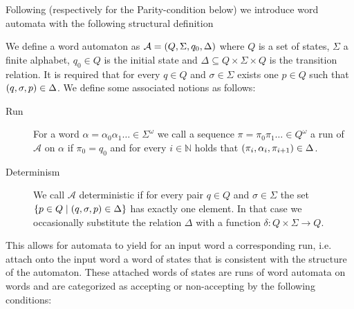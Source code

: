 \label{sec:wordautomata}
Following \cite{LangAutoLog} (respectively \cite[Chapter 1]{AutoLogInfGames}
for the Parity-condition below) we introduce word automata with the following
structural definition
\begin{definition}
  We define a word automaton as
  $\mathcal{A} = \left(Q, \Sigma, q_{0}, \Delta\right)$ where
  $Q$ is a set of states, $\Sigma$ a finite alphabet, $q_{0}\in Q$ is the
  initial state and $\Delta\subseteq Q\times\Sigma\times Q$ is the transition
  relation. It is required that for every $q\in Q$ and $\sigma\in\Sigma$ exists
  one $p\in Q$ such that $\left(q,\sigma, p\right)\in\Delta$. We define some
  associated notions as follows:
  \begin{description}
    \item [Run]
      For a word $\alpha = \alpha_{0}\alpha_{1}\dots\in\Sigma^{\omega}$ we call
      a sequence $\pi = \pi_{0}\pi_{1}\dots \in Q^{\omega}$ a run of
      $\mathcal{A}$ on $\alpha$ if $\pi_{0} = q_{0}$ and for every
      $i\in\mathbb{N}$ holds that
      $\left(\pi_{i}, \alpha_{i}, \pi_{i+1}\right)\in\Delta$.
    \item [Determinism]
      We call $\mathcal{A}$ deterministic if for every pair $q\in Q$ and
      $\sigma\in\Sigma$ the set
      $\left\{p\in Q\mid\left(q,\sigma,p\right)\in\Delta\right\}$ has exactly one
      element. In that case we occasionally substitute the relation $\Delta$ 
      with a function $\delta:Q\times\Sigma\rightarrow Q$.
  \end{description}
\end{definition}
This allows for automata to yield for an input word a corresponding run, i.e.
attach onto the input word a word of states that is consistent with the
structure of the automaton. These attached words of states are runs of word
automata on words and are categorized as accepting or non-accepting by the
following conditions:
